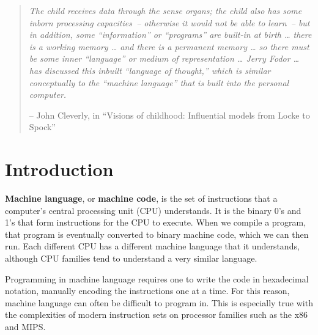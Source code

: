 \lstset{frameround=fttt,captionpos=b}

\begin{quotation} {\em
\noindent
The child receives data through the sense organs; the child also has
some inborn processing capacities~-- otherwise it would not be able
to learn~-- but in addition, some ``information'' or ``programs'' are
built-in at birth
\ldots
there is a working memory
\ldots
and there is a permanent memory
\ldots
so there must be some inner ``language'' or medium of representation
\ldots
Jerry Fodor
\ldots
has discussed this inbuilt ``language of thought,'' which is similar
conceptually to the ``machine language'' that is built into the
personal computer.
}

-- John Cleverly, in ``Visions of childhood: Influential models from
Locke to Spock'' \cite{cleverley1986visions}
\end{quotation}


\section{Introduction}

{\bf Machine language}, or {\bf machine code}, is the set of
instructions that a computer's central processing unit (CPU)
understands.  It is the binary 0's and 1's that form instructions for
the CPU to execute.  When we compile a program, that program is
eventually converted to binary machine code, which we can then run.
Each different CPU has a different machine language that it
understands, although CPU families tend to understand a very similar
language.

Programming in machine language requires one to write the code in
hexadecimal notation, manually encoding the instructions one at a
time.  For this reason, machine language can often be difficult to
program in.  This is especially true with the complexities of modern
instruction sets on processor families such as the x86 and MIPS.


